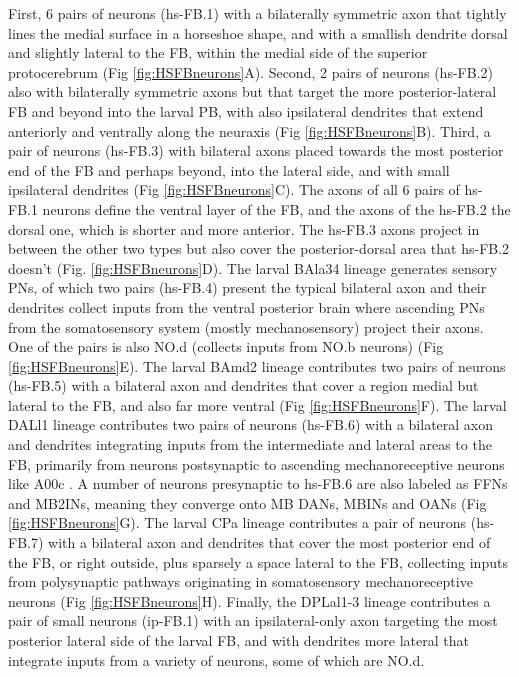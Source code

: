         First, 6 pairs of neurons (hs-FB.1) with a bilaterally symmetric axon that tightly lines the medial surface in a horseshoe shape, and with a smallish dendrite dorsal and slightly lateral to the FB, within the medial side of the superior protocerebrum (Fig \ref{fig:HSFBneurons}A). Second, 2 pairs of neurons (hs-FB.2) also with bilaterally symmetric axons but that target the more posterior-lateral FB and beyond into the larval PB, with also ipsilateral dendrites that extend anteriorly and ventrally along the neuraxis (Fig \ref{fig:HSFBneurons}B).
        Third, a pair of neurons (hs-FB.3) with bilateral axons placed towards the most posterior end of the FB and perhaps beyond, into the lateral side, and with small ipsilateral dendrites (Fig \ref{fig:HSFBneurons}C).
        The axons of all 6 pairs of hs-FB.1 neurons define the ventral layer of the FB, and the axons of the hs-FB.2 the dorsal one, which is shorter and more anterior. The hs-FB.3 axons project in between the other two types but also cover the posterior-dorsal area that hs-FB.2 doesn't (Fig. \ref{fig:HSFBneurons}D).  
        The larval BAla34 lineage generates sensory PNs, of which two pairs (hs-FB.4) present the typical bilateral axon and their dendrites collect inputs from the ventral posterior brain where ascending PNs from the somatosensory system (mostly mechanosensory) project their axons. One of the pairs is also NO.d (collects inputs from NO.b neurons) (Fig \ref{fig:HSFBneurons}E).
        The larval BAmd2 lineage contributes two pairs of neurons (hs-FB.5) with a bilateral axon and dendrites that cover a region medial but lateral to the FB, and also far more ventral (Fig \ref{fig:HSFBneurons}F).
        The larval DALl1 lineage contributes two pairs of neurons (hs-FB.6) with a bilateral axon and dendrites integrating inputs from the intermediate and lateral areas to the FB, primarily from neurons postsynaptic to ascending mechanoreceptive neurons like A00c \citep{ohyama2015multilevel}. A number of neurons presynaptic to hs-FB.6 are also labeled as FFNs and MB2INs, meaning they converge onto MB DANs, MBINs and OANs \citep{eschbach2020recurrent} (Fig \ref{fig:HSFBneurons}G).
        The larval CPa lineage contributes a pair of neurons (hs-FB.7) with a bilateral axon and dendrites that cover the most posterior end of the FB, or right outside, plus sparsely a space lateral to the FB, collecting inputs from polysynaptic pathways originating in somatosensory mechanoreceptive neurons  (Fig \ref{fig:HSFBneurons}H).
        Finally, the DPLal1-3 lineage contributes a pair of small neurons (ip-FB.1) with an ipsilateral-only axon targeting the most posterior lateral side of the larval FB, and with dendrites more lateral that integrate inputs from a variety of neurons, some of which are NO.d.

